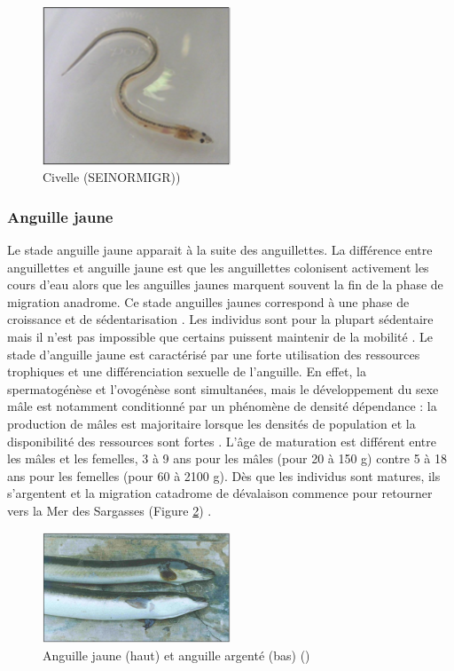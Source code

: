 \documentclass[11pt,titlepage,twoside]{article}\usepackage[]{graphicx}\usepackage[table]{xcolor}
\begin{document}
\begin{figure}[htpb]
\centering
\includegraphics[width=0.5\textwidth]{civelle}
\caption{Civelle (SEINORMIGR))}
\label{civelle}
\end{figure}

\subsubsection{Anguille jaune }

Le stade anguille jaune apparait à la suite des anguillettes. La différence entre anguillettes et anguille jaune est que les anguillettes colonisent activement les cours d’eau alors que les anguilles jaunes marquent souvent la fin de la phase de migration anadrome. Ce stade anguilles jaunes correspond à une phase de croissance et de sédentarisation \citep{laffaille_point_2005}. Les individus sont pour la plupart sédentaire mais il n’est pas impossible que certains puissent maintenir de la mobilité \citep{laffaille_point_2005}. Le stade d’anguille jaune est caractérisé par une forte utilisation des ressources trophiques et une différenciation sexuelle de l’anguille. En effet, la spermatogénèse et l’ovogénèse sont simultanées, mais le développement du sexe mâle est notamment conditionné par un phénomène de densité dépendance : la production de mâles est majoritaire lorsque les densités de population et la disponibilité des ressources sont fortes \citep{passakas_karyological_1980}. L’âge de maturation est différent entre les mâles et les femelles, 3 à 9 ans pour les mâles (pour 20 à 150 g) contre 5 à 18 ans pour les femelles (pour 60 à 2100 g). Dès que les individus sont matures, ils s’argentent et la migration catadrome de dévalaison commence pour retourner vers la Mer des Sargasses (Figure \ref{ang_jaune_argent}) \citep{feunteun_commercially_2011,oliveira_life_1999}.

\begin{figure}[htpb]
\centering
\includegraphics[width=0.5\textwidth]{ang_jaune_argent}
\caption{Anguille jaune (haut) et anguille argenté (bas) (\citep{durif_migration_2003})}
\label{ang_jaune_argent}
\end{figure}
\end{document}
